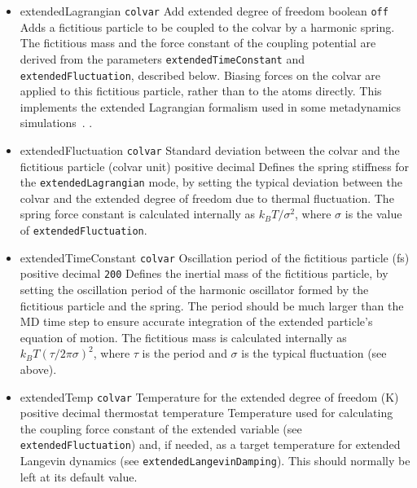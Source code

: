 \begin{itemize}
\item %
  \keydef
    {extendedLagrangian}{%
    \texttt{colvar}}{%
    Add extended degree of freedom}{%
    boolean}{%
    \texttt{off}}{%
    Adds a fictitious particle to be coupled to the colvar by a harmonic
    spring. The fictitious mass and the force constant of the coupling
    potential are derived from the parameters \texttt{extendedTimeConstant}
    and \texttt{extendedFluctuation}, described below. Biasing forces on the
    colvar are applied to this fictitious particle, rather than to the
    atoms directly.  This implements the extended Lagrangian formalism
    used in some metadynamics simulations~\cite{Iannuzzi2003}.
    .
    }

\item %
  \key
    {extendedFluctuation}{%
    \texttt{colvar}}{%
    Standard deviation between the colvar and the fictitious
    particle (colvar unit)}{%
    positive decimal}{%
    Defines the spring stiffness for the \texttt{extendedLagrangian}
    mode, by setting the typical deviation between the colvar and the extended
    degree of freedom due to thermal fluctuation.
    The spring force constant is calculated internally as $k_B T / \sigma^2$,
    where $\sigma$ is the value of \texttt{extendedFluctuation}.}

\item %
  \keydef
    {extendedTimeConstant}{%
    \texttt{colvar}}{%
    Oscillation period of the fictitious particle (fs)}{%
    positive decimal}{%
    \texttt{200}}{%
    Defines the inertial mass of the fictitious particle, by setting the
    oscillation period of the harmonic oscillator formed by the fictitious
    particle and the spring. The period
    should be much larger than the MD time step to ensure accurate integration
    of the extended particle's equation of motion.
    The fictitious mass is calculated internally as $k_B T (\tau/2 \pi \sigma)^2$,
    where $\tau$ is the period and $\sigma$ is the typical fluctuation (see above).}

\item %
  \keydef
    {extendedTemp}{%
    \texttt{colvar}}{%
    Temperature for the extended degree of freedom (K)}{%
    positive decimal}{%
    thermostat temperature}{%
    Temperature used for calculating the coupling force constant of the
    extended variable (see \texttt{extendedFluctuation}) and, if needed, as a
    target temperature for extended Langevin dynamics (see
    \texttt{extendedLangevinDamping}). This should normally be left at its
    default value.}


\end{itemize}
